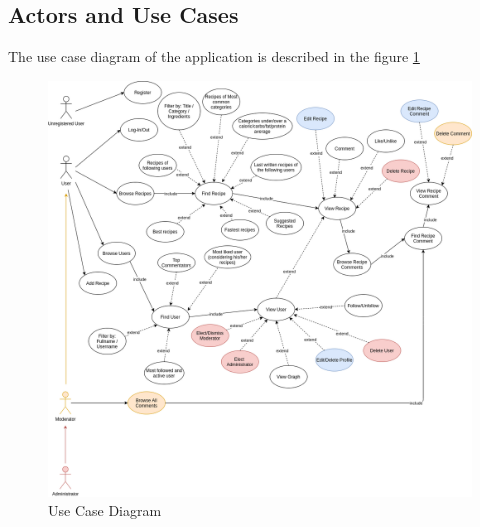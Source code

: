 \documentclass[a4paper]{report}
\begin{document}
\subsection{Actors and Use Cases}
The use case diagram of the application is described in the figure \ref{img: Use Case Diagram}

\begin{figure}[htpb]
	\centering
	\includegraphics[scale=0.4]{img/UseCaseDiagram.png}
	\caption{Use Case Diagram}
	\label {img: Use Case Diagram}
\end{figure}
\end{document}
